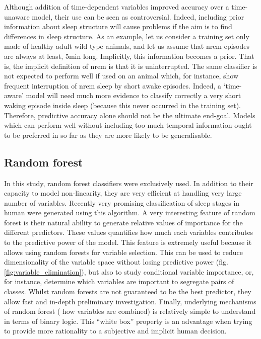 Although addition of time-dependent variables improved accuracy over a time-unaware model, their use can be seen as controversial.
Indeed, including prior information about sleep structure will cause problems if the aim is to find differences in sleep structure.
As an example, let us consider a training set only made of healthy adult wild type animals,
and let us assume that \gls{nrem} episodes are always at least, 5min long.
Implicitly, this information becomes a prior. That is, the implicit definition of \gls{nrem} is that it
is uninterrupted.
The same classifier is not expected to perform well if used on an animal which, for instance, show frequent interruption of  \gls{nrem} sleep by short awake episodes.
Indeed, a `time-aware' model will need much more evidence to classify correctly a very short waking episode inside sleep (because this never occurred in the training set).
Therefore, predictive accuracy alone should not be the ultimate end-goal.
Models which can perform well without including too much temporal information ought to be preferred in so far as
they are more likely to be generalisable.



\subsection{Random forest}

In this study, random forest\citationneeded{} classifiers were exclusively used.
In addition to their capacity to model non-linearity, they are very efficient at handling very large number of variables.
Recently very promising classification of sleep stages in human were generated using this algorithm\citationneeded{}.
A very interesting feature of random forest is their
natural ability to generate relative values of importance for the different predictors.
These values quantifies how much each variables contributes to the predictive power of the model.
This feature is extremely useful because it allows using random forests for variable selection.
This can be used to reduce dimensionality of the variable space without losing predictive power (fig.\ref{fig:variable_elimination}),
but also to study conditional variable importance, or, for instance,
determine which variables are important to segregate pairs of classes.
Whilst random forests are not guaranteed to be the best predictor, they allow fast and in-depth preliminary investigation.
Finally, underlying mechanisms of random forest (\ie{} how  variables are combined) is relatively simple to understand in terms of binary logic.
This ``white box'' property is an advantage when trying to provide more rationality to a subjective and implicit human decision.



